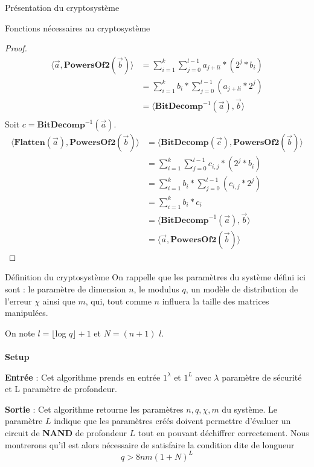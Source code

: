 \begin{section}{Présentation du cryptosystème}
\begin{subsection}{Fonctions nécessaires au cryptosystème}
	\begin{proof}
	\begin{align*}
	\langle \vec{a}, \textbf{PowersOf2}(\vec{b}) \rangle &= \sum\limits_{i=1}^{k} \sum\limits_{j=0}^{l-1} a_{j+li} * (2^{j} * b_i) \\
	&= \sum\limits_{i=1}^{k} b_i * \sum\limits_{j=0}^{l-1} (a_{j+li} * 2^{j}) \\
	&= \langle \textbf{BitDecomp}^{-1}(\vec{a}), \vec{b}\rangle \\
	\end{align*}
	Soit $c = \textbf{BitDecomp}^{-1}(\vec{a})$.
	\begin{align*}
	\langle \textbf{Flatten}(\vec{a}),\textbf{PowersOf2}(\vec{b}) \rangle &= \langle \textbf{BitDecomp}(\vec{c}),\textbf{PowersOf2}(\vec{b}) \rangle \\
	&= \sum\limits_{i=1}^{k} \sum\limits_{j=0}^{l-1} c_{i,j} * (2^{j} * b_i) \\
	&= \sum\limits_{i=1}^{k} b_i * \sum\limits_{j=0}^{l-1} (c_{i,j} * 2^{j}) \\
	&= \sum\limits_{i=1}^{k} b_i * c_i \\
	&= \langle \textbf{BitDecomp}^{-1}(\vec{a}), \vec{b}\rangle \\
	&= \langle \vec{a}, \textbf{PowersOf2}(\vec{b}) \rangle
	\end{align*}
	\end{proof}
	
	\end{subsection}
	\begin{subsection}{Définition du cryptosystème}
	On rappelle que les paramètres du système défini ici sont : le paramètre de dimension $n$, le modulus $q$, un modèle de distribution de l'erreur $\chi$ ainsi que $m$, qui, tout comme $n$ influera la taille des matrices manipulées.

	On note $l = \lfloor$log $q\rfloor + 1$ et $N = (n + 1)$ $l$.
		
	\paragraph{}
	\textbf{Setup}
	\flushleft

	\textbf{Entrée} : Cet algorithme prends en entrée $1^\lambda$ et $1^L$ avec $\lambda$ paramètre de sécurité et L paramètre de profondeur.

	\textbf{Sortie} : Cet algorithme retourne les paramètres $n, q, \chi, m$ du système. Le paramètre $L$ indique que les paramètres créés doivent permettre d'évaluer un circuit de \textbf{NAND} de profondeur $L$ tout en pouvant déchiffrer correctement. Nous montrerons qu'il est alors nécessaire de satisfaire la condition dite \og de longueur \fg  
	\[q > 8nm (1 + N)^L \]


\end{subsection}
\end{section}
